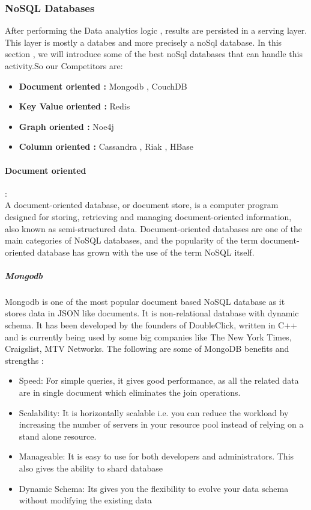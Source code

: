 \subsubsection{NoSQL Databases}
\label{sec:sec01}
After performing the Data analytics logic , results are persisted in a serving layer. This layer is mostly a databes and more 
precisely a noSql database. In this section , we will introduce some of the best noSql databases that can 
handle this activity.So our Competitors are:
\begin{itemize}
  \item \textbf{Document oriented :} Mongodb , CouchDB
  \item \textbf{Key Value oriented :} Redis
  \item \textbf{Graph oriented :} Noe4j 
  \item \textbf{Column oriented :} Cassandra , Riak , HBase
\end{itemize}

\paragraph{Document oriented} 
\label{sec:sec01} :\\
A document-oriented database, or document store, is a computer program designed for storing, 
retrieving and managing document-oriented information, also known as semi-structured data.
 Document-oriented databases are one of the main categories of NoSQL databases, 
 and the popularity of the term document-oriented database has grown with the use of the term NoSQL itself.
\subparagraph{Mongodb} 
\label{sec:sec01}
Mongodb is one of the most popular document based NoSQL database as it stores data in JSON like documents.
 It is non-relational database with dynamic schema. 
 It has been developed by the founders of DoubleClick, written in C++ and is currently being used by 
 some big companies like The New York Times, Craigslist, MTV Networks. 
 The following are some of MongoDB benefits and strengths :

 \begin{itemize}
  \item Speed: For simple queries, it gives good performance, as all the related data are in single document which eliminates the join operations.
  \item Scalability: It is horizontally scalable i.e. you can reduce the workload by increasing the number of servers in your resource pool instead of relying on a stand alone resource.
  \item Manageable: It is easy to use for both developers and administrators. This also gives the ability to shard database
  \item Dynamic Schema: Its gives you the flexibility to evolve your data schema without modifying the existing data
\end{itemize}

